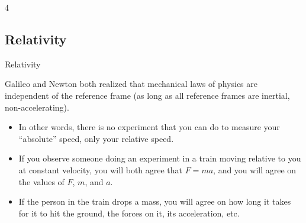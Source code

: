 \documentclass[aspectratio=169,
hyperref={colorlinks,urlcolor=blue}
]{beamer}
\begin{document}
{
\centering
\vspace{-0.75cm}
\pgfmathtruncatemacro{}
\begin{animateinline}{4} %

\end{animateinline}
}


\subsection{Relativity}
\label{subsec:relativity}
\begin{bulletframe}{Relativity}
\item Galileo and Newton both realized that mechanical laws of physics are independent of the reference frame (as long as all reference frames are inertial, non-accelerating).
\begin{itemize}
\item In other words, there is no experiment that you can do to measure your ``absolute'' speed, only your relative speed.
\item<2-> If you observe someone doing an experiment in a train moving relative to you at constant velocity, you will both agree that $F=ma$, and you will agree on the values of $F$, $m$, and $a$.
\item<2-> If the person in the train drops a mass, you will agree on how long it takes for it to hit the ground, the forces on it, its acceleration, etc.
\end{itemize}
\end{bulletframe}
\end{document}
